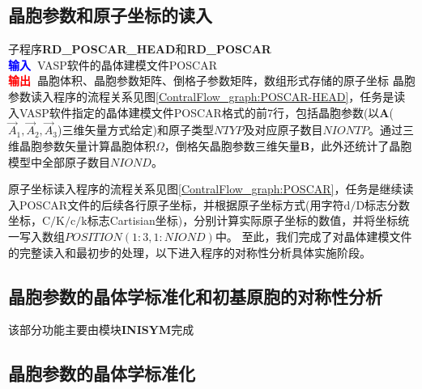 \subsection{晶胞参数和原子坐标的读入}
子程序\textbf{RD\_POSCAR\_HEAD}和\textbf{RD\_POSCAR}\\
\textbf{\textcolor{blue}{输入~}}\textrm{VASP}软件的晶体建模文件\textrm{POSCAR}\\
\textbf{\textcolor{red}{输出~}}晶胞体积、晶胞参数矩阵、倒格子参数矩阵，数组形式存储的原子坐标
晶胞参数读入程序的流程关系见图\ref{ContralFlow_graph:POSCAR-HEAD}，任务是读入\textrm{VASP}软件指定的晶体建模文件\textrm{POSCAR}格式的前7行，包括晶胞参数(以$\mathbf{A}$($\vec A_1,\vec A_2,\vec A_3$)三维矢量方式给定)和原子类型$\mathit{NTYP}$及对应原子数目$\mathit{NIONTP}$。通过三维晶胞参数矢量计算晶胞体积$\Omega$，倒格矢晶胞参数三维矢量$\mathbf{B}$，此外还统计了晶胞模型中全部原子数目$\mathit{NIOND}$。

原子坐标读入程序的流程关系见图\ref{ContralFlow_graph:POSCAR}，任务是继续读入\textrm{POSCAR}文件的后续各行原子坐标，并根据原子坐标方式(用字符$\mathrm{d/D}$标志分数坐标，$\mathrm{C/K/c/k}$标志\textrm{Cartisian}坐标)，分别计算实际原子坐标的数值，并将坐标统一写入数组$\mathit{POSITION}(1:3,1:\mathit{NIOND})$中。
至此，我们完成了对晶体建模文件的完整读入和最初步的处理，以下进入程序的对称性分析具体实施阶段。

\subsection{晶胞参数的晶体学标准化和初基原胞的对称性分析}
该部分功能主要由模块\textbf{INISYM}完成
\subsection{晶胞参数的晶体学标准化}

